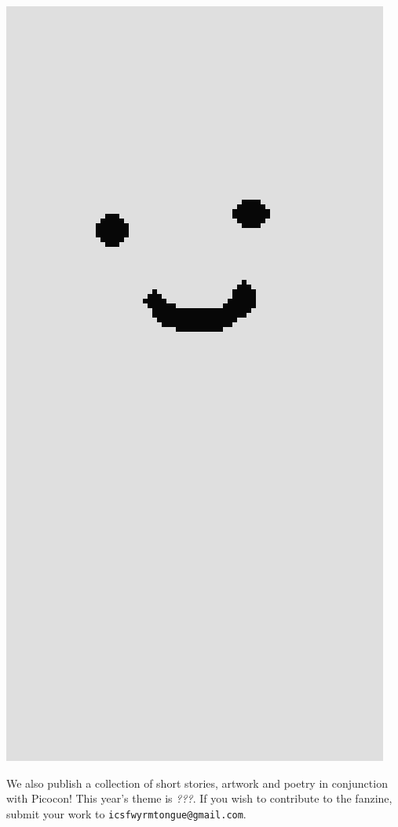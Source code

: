 
\begin{center}
    \includegraphics[height=\textwidth]{img/profile/placeholder.png}
\end{center}

We also publish a collection of short stories, artwork and poetry in conjunction with Picocon! This year's theme is \textit{???}. If you wish to contribute to the fanzine, submit your work to \texttt{icsfwyrmtongue@gmail.com}\footnotemark[2]. 
